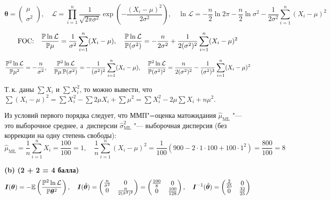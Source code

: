 \documentclass[pdftex,11pt,openany]{book}\usepackage[]{graphicx}\usepackage[]{color}
\newcommand{\calL}{\mathcal{L}}
\newcommand{\bs}[1]{\boldsymbol{#1}}
\begin{document}
\begin{solution}
\[
\bs\theta =
\begin{pmatrix} \mu \\ \sigma^2 \end{pmatrix}, \quad
\calL = \prod_{i=1}^n \frac{1}{\sqrt{2\pi\sigma^2}} \exp \left( -\frac{(X_i-\mu)^2}{2\sigma^2} \right), \quad
\ln \calL = -\frac{n}{2}\ln 2\pi - \frac{n}{2} \ln \sigma^2 - \frac{1}{2\sigma^2} \sum\limits_{i=1}^n (X_i-\mu)^2
\]

\[
\text{FOC:} \quad
\frac{\p \ln \calL}{\p \mu} = \frac{1}{\sigma^2} \sum\limits_{i=1}^n (X_i-\mu), \quad \frac{\p \ln \calL}{\p (\sigma^2)} = -\frac{n}{2\sigma^2} + \frac{1}{2(\sigma^2)^2} \sum\limits_{i=1}^n (X_i-\mu)^2
\]

\[
\frac{\p^2 \ln \calL}{\p \mu^2} = -\frac{n}{\sigma^2}, \quad \frac{\p^2 \ln \calL}{\p \mu \, \p (\sigma^2)} = -\frac{1}{(\sigma^2)^2} \sum\limits_{i=1}^n (X_i - \mu), \quad \frac{\p^2 \ln \calL}{\p (\sigma^2)^2} = \frac{n}{2(\sigma^2)^2} - \frac{1}{(\sigma^2)^3} \sum\limits_{i=1}^n (X_i - \mu)^2
\]

Т.\,к. даны $\sum X_i$ и $\sum X_i^2$, то можно вывести, что $\sum(X_i - \mu)^2 = \sum X_i^2 - \sum 2\mu X_i + \sum \mu^2 = \sum X_i^2 - 2\mu \sum X_i + n \mu^2$.

Из условий первого порядка следует, что ММП"=оценка матожидания $\hat\mu_{\text{ML}}$ "--- это выборочное среднее, а~дисперсии $\hat\sigma^2_{\text{ML}}$ "--- выборочная дисперсия (без коррекции на одну степень свободы):
\[
\hat \mu_{\text{ML}} = \frac1n \sum\limits_{i=1}^n X_i = \frac{100}{100} = 1, \quad \frac{1}{n}\sum\limits_{i=1}^n (X_i - \mu)^2  = \frac{1}{100}(900 - 2\cdot 1 \cdot 100 + 100\cdot 1^2) = \frac{800}{100} = 8
\]

\par\smallskip

\textbf{(b) (2 + 2 = 4 балла)}
\[
\bs{I}(\bs\theta) = -\E\left( \frac{\p^2 \ln \calL}{\p \bs\theta^2} \right), \quad \bs{I}(\hat{\bs\theta}) = \begin{pmatrix} \frac{n}{\hat\sigma^2} & 0 \\ 0 & \frac{n}{2(\hat\sigma^2)^2} \end{pmatrix} = \begin{pmatrix} \frac{100}{8} & 0 \\ 0 & \frac{100}{128}  \end{pmatrix}, \quad \bs{I}^{-1}(\hat{\bs\theta}) = \begin{pmatrix} \frac{2}{25} & 0 \\ 0 & \frac{32}{25} \end{pmatrix}
\]


\end{solution}
\end{document}
